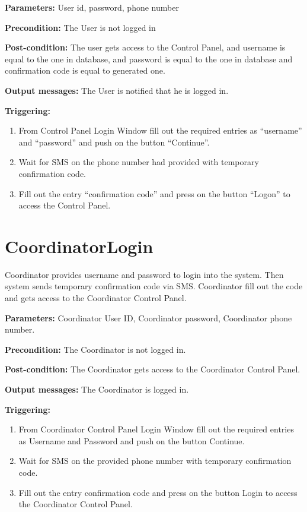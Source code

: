 \begin{description}

\item \textbf{Parameters:} User id, password, phone number
\item \textbf{Precondition:} The User is not logged in
\item \textbf{Post-condition:} The user gets access to the Control Panel, and
username is equal to the one in database, and password is equal to the one in
database and confirmation code is equal to generated one.
\item \textbf{Output messages:} The User is notified that he is logged in.

\item \textbf{Triggering:}
\begin{enumerate}
\item From Control Panel Login Window fill out the required entries as
``username'' and ``password'' and push on the button ``Continue''.
\item Wait for SMS on the phone number had provided with temporary confirmation
code.
\item Fill out the entry ``confirmation code'' and press on the button ``Logon''
to access the Control Panel.
\end{enumerate}
 
\end{description}


\section{CoordinatorLogin}
\label{operation:CoordinatorLogin}
Coordinator provides username and password to login into the system. 
Then system sends temporary confirmation code via SMS. 
Coordinator fill out the code and gets access to the Coordinator Control Panel.
\begin{description}

\item \textbf{Parameters:} Coordinator User ID, Coordinator password,
Coordinator phone number.
\item \textbf{Precondition:} The Coordinator is not logged in.
\item \textbf{Post-condition:} The Coordinator gets access to the
Coordinator Control Panel.
\item \textbf{Output messages:} The Coordinator is logged in.

\item \textbf{Triggering:}
\begin{enumerate}
\item From Coordinator Control Panel Login Window fill out the required entries as Username and Password and push on the button Continue.
\item Wait for SMS on the provided phone number with temporary confirmation code.
\item Fill out the entry confirmation code and press on the button Login to
access the Coordinator Control Panel.
\end{enumerate}
 
\end{description}


